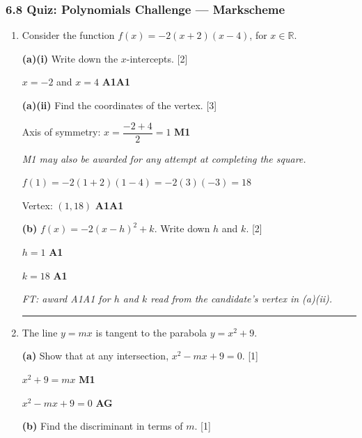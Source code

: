 \documentclass[12pt, twoside]{article}
\begin{document}
\subsubsection*{6.8 Quiz: Polynomials Challenge --- Markscheme}

\begin{enumerate}[itemsep=0.3cm]

\item[1.] [Maximum mark: 7]

Consider the function $f(x) = -2(x + 2)(x - 4)$, for $x \in \mathbb{R}$.

\medskip

\textbf{(a)(i)} Write down the $x$-intercepts. \hfill [2]

$x = -2$ and $x = 4$ \hfill \textbf{A1A1}

\medskip

\textbf{(a)(ii)} Find the coordinates of the vertex. \hfill [3]

Axis of symmetry: $x = \dfrac{-2 + 4}{2} = 1$ \hfill \textbf{M1}

\emph{M1 may also be awarded for any attempt at completing the square.}

$f(1) = -2(1 + 2)(1 - 4) = -2(3)(-3) = 18$

Vertex: $(1, 18)$ \hfill \textbf{A1A1}

\medskip

\textbf{(b)} $f(x) = -2(x - h)^2 + k$. Write down $h$ and $k$. \hfill [2]

$h = 1$ \hfill \textbf{A1}

$k = 18$ \hfill \textbf{A1}

\emph{FT: award A1A1 for $h$ and $k$ read from the candidate's vertex in (a)(ii).}

\bigskip
\hrule
\bigskip

\item[2.] [Maximum mark: 7]

The line $y = mx$ is tangent to the parabola $y = x^2 + 9$.

\medskip

\textbf{(a)} Show that at any intersection, $x^2 - mx + 9 = 0$. \hfill [1]

$x^2 + 9 = mx$ \hfill \textbf{M1}

$x^2 - mx + 9 = 0$ \hfill \textbf{AG}

\medskip

\textbf{(b)} Find the discriminant in terms of $m$. \hfill [1]


\end{enumerate}
\end{document}

